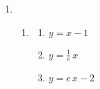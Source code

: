 \documentclass{ximera}
\begin{document}
\begin{enumerate}
\setcounter{enumi}{\value{HW}}

\addtocounter{enumi}{7}

\item   \begin{enumerate} \addtocounter{enumii}{3}  \item \begin{multicols}{3} \begin{enumerate}

\item  $y = x - 1$

\item  $y = \frac{1}{e} \, x$

\item $y = e \, x -2$

\end{enumerate}

\end{multicols}

\end{enumerate}

\setcounter{HW}{\value{enumi}}
\end{enumerate}
\end{document}
